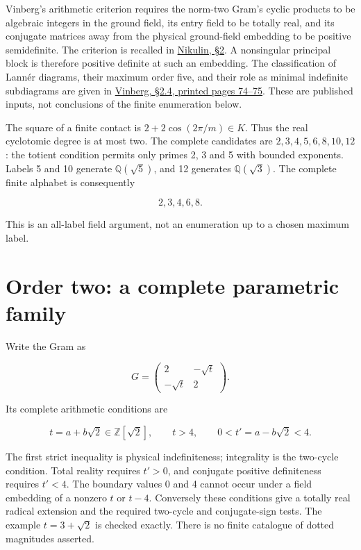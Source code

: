 \documentclass[
  10pt,
]{report}
\begin{document}
Vinberg's arithmetic criterion requires the norm-two Gram's cyclic
products to be algebraic integers in the ground field, its entry field
to be totally real, and its conjugate matrices away from the physical
ground-field embedding to be positive semidefinite. The criterion is
recalled in \href{https://arxiv.org/pdf/0708.3991}{Nikulin, §2}. A
nonsingular principal block is therefore positive definite at such an
embedding. The classification of Lannér diagrams, their maximum order
five, and their role as minimal indefinite subdiagrams are given in
\href{https://www.mathnet.ru/php/getFT.phtml?jrnid=mmo&option_lang=rus&paperid=444&what=fullt}{Vinberg,
§2.4, printed pages 74--75}. These are published inputs, not conclusions
of the finite enumeration below.

The square of a finite contact is \(2+2\cos(2\pi/m)\in K\). Thus the
real cyclotomic degree is at most two. The complete candidates are
\(2,3,4,5,6,8,10,12\): the totient condition permits only primes 2, 3
and 5 with bounded exponents. Labels 5 and 10 generate
\(\mathbb Q(\sqrt5)\), and 12 generates \(\mathbb Q(\sqrt3)\). The
complete finite alphabet is consequently

\[
\boxed{2,3,4,6,8}.
\]

This is an all-label field argument, not an enumeration up to a chosen
maximum label.

\section{Order two: a complete parametric
family}\label{order-two-a-complete-parametric-family}

Write the Gram as

\[
G=\begin{pmatrix}2&-\sqrt t\\-\sqrt t&2\end{pmatrix}.
\]

Its complete arithmetic conditions are

\[
\boxed{t=a+b\sqrt2\in\mathbb Z[\sqrt2],\qquad t>4,
\qquad 0<t'=a-b\sqrt2<4.}
\]

The first strict inequality is physical indefiniteness; integrality is
the two-cycle condition. Total reality requires \(t'>0\), and conjugate
positive definiteness requires \(t'<4\). The boundary values 0 and 4
cannot occur under a field embedding of a nonzero \(t\) or \(t-4\).
Conversely these conditions give a totally real radical extension and
the required two-cycle and conjugate-sign tests. The example
\(t=3+\sqrt2\) is checked exactly. There is no finite catalogue of
dotted magnitudes asserted.
\end{document}
